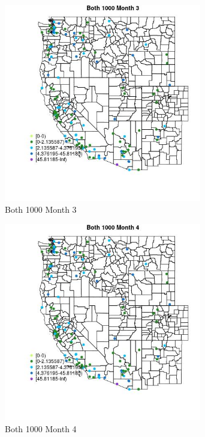 \begin{figure} 
\centering  
\includegraphics[width=0.77\textwidth]{Code_Outputs/Report_ML_input_PM25_Step4_part_e_de_duplicated_aves_MapObsMo3Both_1000.jpg} 
\caption{\label{fig:Report_ML_input_PM25_Step4_part_e_de_duplicated_avesMapObsMo3Both_1000}Both 1000 Month 3} 
\end{figure} 
 

\begin{figure} 
\centering  
\includegraphics[width=0.77\textwidth]{Code_Outputs/Report_ML_input_PM25_Step4_part_e_de_duplicated_aves_MapObsMo4Both_1000.jpg} 
\caption{\label{fig:Report_ML_input_PM25_Step4_part_e_de_duplicated_avesMapObsMo4Both_1000}Both 1000 Month 4} 
\end{figure} 
 


